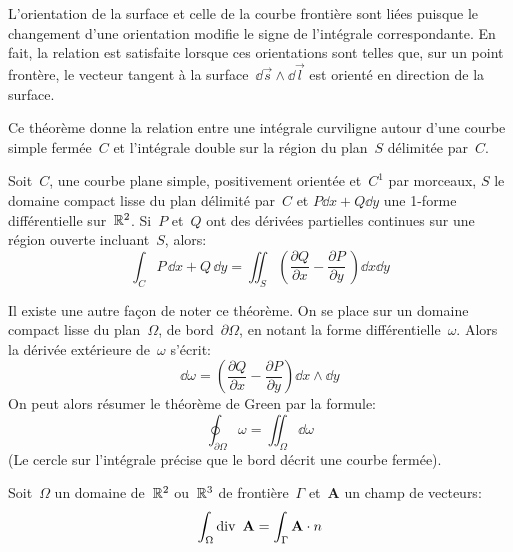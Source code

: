 \medskip
L'orientation de la surface et celle de la courbe frontière sont liées puisque le changement
d'une orientation modifie le signe de l'intégrale correspondante.
En fait, la relation est satisfaite lorsque ces orientations sont telles que, sur un point frontère,
le vecteur tangent à la surface~$\dd \vec s \wedge \dd \vec l$ est orienté
en direction de la surface.


\medskip
\begin{theoreme}%

Ce théorème donne la relation entre une intégrale curviligne autour d'une courbe simple fermée~$C$ et l'intégrale double sur la région du plan~$S$ délimitée par~$C$.

Soit~$C$, une courbe plane simple, positivement orientée et~$C^1$ par morceaux, $S$ le domaine compact lisse du plan délimité par~$C$ et 
$P\dd x + Q\dd y$ une 1-forme différentielle sur~$\mathbb R^2$. Si~$P$ et~$Q$ ont des dérivées partielles continues sur une région ouverte incluant~$S$, alors:
\begin{equation}
\int_C P\,\dd x + Q\,\dd y = \iint_S \left( \frac{\partial Q}{\partial x} - \frac{\partial P}{\partial y}\ \right) \dd x\dd y
\end{equation}
\end{theoreme}

\medskip{}
Il existe une autre façon de noter ce théorème.
On se place sur un domaine compact lisse du plan~$\Omega$, de bord~$\partial\Omega$,
en notant la forme différentielle~$\omega$.
Alors la dérivée extérieure de~$\omega$ s'écrit:
\begin{equation}
\dd \omega = \left( \frac{\partial Q}{\partial x} - \frac{\partial P}{\partial y} \right) \dd x \wedge \dd y
\end{equation}
On peut alors résumer le théorème de Green par la formule:
\begin{equation}
\oint_{\partial \Omega} \omega = \iint_{\Omega} \dd\omega
\end{equation}
(Le cercle sur l'intégrale précise que le bord décrit une courbe fermée).

\medskip
\begin{theoreme}%
Soit~$\Omega$ un domaine de~$\mathbb R^2$ ou~$\mathbb R^3$ de frontière~$\Gamma$
et~$\mathbf{A}$ un champ de vecteurs:
\begin{equation}
  \int_\Omega \dive\ \mathbf{A} = \int_\Gamma \mathbf{A}\cdot n
\end{equation}
\end{theoreme}


